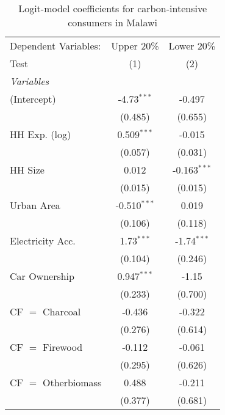 
\begin{table}[htbp!]
   \centering
   \small
   \begin{adjustbox}{width = 1\textwidth, max height = 0.95\textheight, center}
      \begin{threeparttable}[b]
         \caption{\label{tab:Logit_1_MWI} Logit-model coefficients for carbon-intensive consumers in Malawi}
         \begin{tabular}{lcc}
            \tabularnewline \midrule \midrule
            Dependent Variables: & Upper 20\%     & Lower 20\%\\   
            Test                 & (1)            & (2)\\  
            \midrule
            \emph{Variables}\\
            (Intercept)          & -4.73$^{***}$  & -0.497\\   
                                 & (0.485)        & (0.655)\\   
            HH Exp. (log)        & 0.509$^{***}$  & -0.015\\   
                                 & (0.057)        & (0.031)\\   
            HH Size              & 0.012          & -0.163$^{***}$\\   
                                 & (0.015)        & (0.015)\\   
            Urban Area           & -0.510$^{***}$ & 0.019\\   
                                 & (0.106)        & (0.118)\\   
            Electricity Acc.     & 1.73$^{***}$   & -1.74$^{***}$\\   
                                 & (0.104)        & (0.246)\\   
            Car Ownership        & 0.947$^{***}$  & -1.15\\   
                                 & (0.233)        & (0.700)\\   
            CF $=$ Charcoal      & -0.436         & -0.322\\   
                                 & (0.276)        & (0.614)\\   
            CF $=$ Firewood      & -0.112         & -0.061\\   
                                 & (0.295)        & (0.626)\\   
            CF $=$ Otherbiomass  & 0.488          & -0.211\\   
                                 & (0.377)        & (0.681)\\   

\end{tabular}
\end{threeparttable}
\end{adjustbox}
\end{table}
